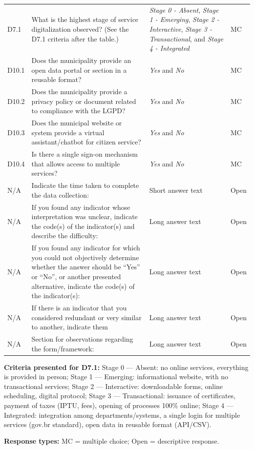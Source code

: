 \documentclass[12pt]{article}
\begin{document}
\begin{longtable}{@{}L{0.09\textwidth}L{0.43\textwidth}L{0.32\textwidth}L{0.10\textwidth}@{}}
D7.1 & What is the highest stage of service digitalization observed? (See the D7.1 criteria after the table.) & \emph{Stage 0 - Absent}, \emph{Stage 1 - Emerging}, \emph{Stage 2 - Interactive}, \emph{Stage 3 - Transactional}, and \emph{Stage 4 - Integrated} & MC \\
D10.1 & Does the municipality provide an open data portal or section in a reusable format? & \emph{Yes} and \emph{No} & MC \\
D10.2 & Does the municipality provide a privacy policy or document related to compliance with the LGPD? & \emph{Yes} and \emph{No} & MC \\
D10.3 & Does the municipal website or system provide a virtual assistant/chatbot for citizen service? & \emph{Yes} and \emph{No} & MC \\
D10.4 & Is there a single sign-on mechanism that allows access to multiple services? & \emph{Yes} and \emph{No} & MC \\
N/A & Indicate the time taken to complete the data collection: & Short answer text & Open \\
N/A & If you found any indicator whose interpretation was unclear, indicate the code(s) of the indicator(s) and describe the difficulty: & Long answer text & Open \\
N/A & If you found any indicator for which you could not objectively determine whether the answer should be ``Yes'' or ``No'', or another presented alternative, indicate the code(s) of the indicator(s): & Long answer text & Open \\
N/A & If there is an indicator that you considered redundant or very similar to another, indicate them & Long answer text & Open \\
N/A & Section for observations regarding the form/framework: & Long answer text & Open \\
\end{longtable}
\endgroup
\noindent\begin{minipage}{\textwidth}
\small
\textbf{Criteria presented for D7.1:} Stage 0 --- Absent: no online services, everything is provided in person;
Stage 1 --- Emerging: informational website, with no transactional services;
Stage 2 --- Interactive: downloadable forms, online scheduling, digital protocol;
Stage 3 --- Transactional: issuance of certificates, payment of taxes (IPTU, fees), opening of processes 100\% online;
Stage 4 --- Integrated: integration among departments/systems, a single login for multiple services
(gov.br standard), open data in reusable format (API/CSV).
\par\smallskip\noindent\textbf{Response types:} MC = multiple choice; Open = descriptive response.
\end{minipage}
\par
\justifying
\end{document}
